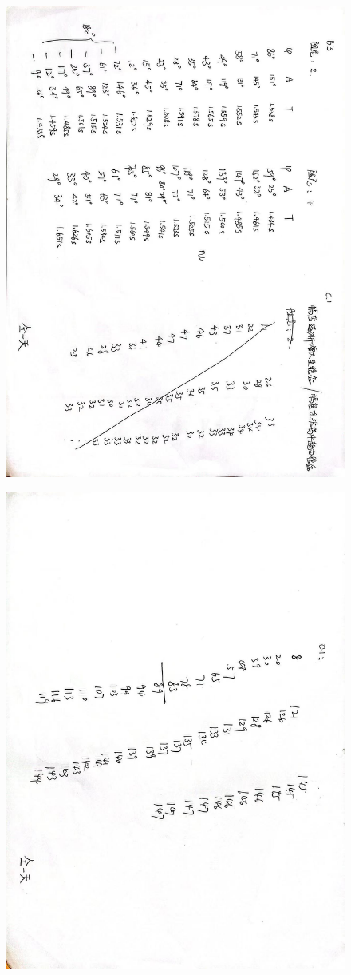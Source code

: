 \documentclass[11pt,a4paper,UTF8]{ctexart}
\begin{document}
\begin{figure}[h]
	\centering
	\includegraphics[width=.95\linewidth]{原始数据2.jpg}
\end{figure}

\begin{figure}[h]
	\centering
	\includegraphics[width=.95\linewidth]{原始数据3.jpg}
\end{figure}
\vfill\noindent\itshape\footnotesize
\end{document}
